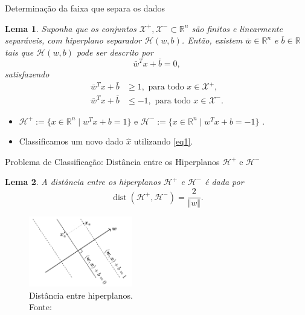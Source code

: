 \documentclass{beamer}
\DeclareMathOperator{\proj}{proj}
\DeclareMathOperator{\dist}{dist}
\def\Xset{\mathcal{X}}
\def\Hset{\mathcal{H}}
\def\RR{\mathds{R}}
\def\xbar{\bar{x}}
\def\wbar{\bar{w}}
\def\bbar{\bar{b}}
\newtheorem{prop}{Proposição}
\newtheorem{lema}{Lema}
\theoremstyle{definition}%
\begin{document}
\begin{frame}{Determinação da faixa que separa os dados}
\begin{lema} \label{lema1} Suponha que os conjuntos $\Xset^{+}, \Xset^{-} \subset \RR^n$ são finitos e linearmente separáveis, com hiperplano separador $\Hset(w,b)$. Então, existem $\overline{w}\in \RR^n$ e $\overline{b}\in \RR$ tais que $\Hset(w,b)$ pode ser descrito por
\[\wbar^{T}x+\bbar =0,\]
satisfazendo
\begin{align}
\wbar^{T}x+\bbar &\geq 1, \text{ para todo } x\in \Xset^{+}, \label{eq1} \\
\wbar^{T}x+\bbar &\leq -1, \text{ para todo } x\in \Xset^{-}. \label{eq2}
\end{align}
\end{lema} 
\pause
\begin{itemize}
	\item $\Hset^{+}:=\{x\in \RR^n \mid w^{T}x+b= 1\}$ e $\Hset^{-}:=\{x\in \RR^n \mid w^{T}x+b= -1\}$ .

	\item Classificamos um novo dado $\hat{x}$ utilizando \eqref{eq1}.
\end{itemize}
\end{frame}




\begin{frame}{Problema de Classificação: Distância entre os Hiperplanos $\Hset^{+}$ e $\Hset^{-}$}

\begin{lema}\label{lema2} A distância entre os hiperplanos $\Hset^{+}$ e $\Hset^{-}$ é dada por \[\dist(\Hset^{+} , \Hset^{-})=\dfrac{2}{\Vert w\Vert}.\]
\end{lema}

\begin{figure}[!h] 
	\centering
	\includegraphics[width=0.40\textwidth]{distancia_hiperplanos}
	\caption{Distância entre hiperplanos. \\ Fonte: \textcite{Faisal2019}}
\end{figure}
\end{frame}
\end{document}
